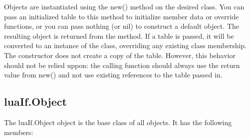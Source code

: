 \documentclass{book}
\begin{document}
Objects are instantiated using the new() method on the desired
class. You can pass an initialized table to this method to initialize
member data or override functions, or you can pass nothing (or nil) to
construct a default object. The resulting object is returned from the
method. If a table is passed, it will be converted to an instance of
the class, overriding any existing class membership. The constructor
does not create a copy of the table. However, this behavior should not
be relied uppon: the calling function should always use the return
value from new() and not use existing references to the table passed
in.

\subsection{luaIf.Object}
\label{section:luaIf.Object}

The luaIf.Object object is the base class of all objects. It has the
following members:
\end{document}
